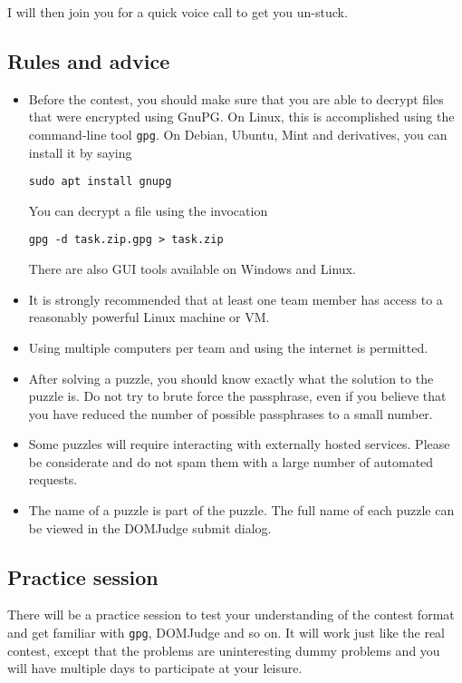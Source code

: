 \documentclass[fontsize=10pt,a4paper,DIV=12,parskip=half]{scrarticle}
\begin{document}
I will then join you for a quick voice call to get you un-stuck.

\subsection*{Rules and advice}
\begin{itemize}
	\item Before the contest, you should make sure that you are able to decrypt
		files that were encrypted using GnuPG. On Linux, this is accomplished
		using the command-line tool \texttt{gpg}. On Debian, Ubuntu, Mint and derivatives, you can
		install it by saying
		\begin{center}
			\texttt{sudo apt install gnupg}
		\end{center}
		You can decrypt a file using the invocation
		\begin{center}
			\texttt{gpg -d task.zip.gpg > task.zip}
		\end{center}
		There are also GUI tools available on Windows and Linux.
	\item It is strongly recommended that at least one team member has access
		to a reasonably powerful Linux machine or VM.
	\item Using multiple computers per team and using the internet is permitted.
	\item After solving a puzzle, you should know exactly what the solution to
		the puzzle is. Do not try to brute force the passphrase, even if you
		believe that you have reduced the number of possible passphrases to a
		small number.
	\item Some puzzles will require interacting with externally hosted services.
		Please be considerate and do not spam them with a large number of automated
		requests.
	\item The name of a puzzle is part of the puzzle. The full name of each puzzle
		can be viewed in the DOMJudge submit dialog.
\end{itemize}

\subsection*{Practice session}
There will be a practice session to test your understanding of the contest format and
get familiar with \texttt{gpg}, DOMJudge and so on. It will work just like the real
contest, except that the problems are uninteresting dummy problems and you will have
multiple days to participate at your leisure.
\end{document}
